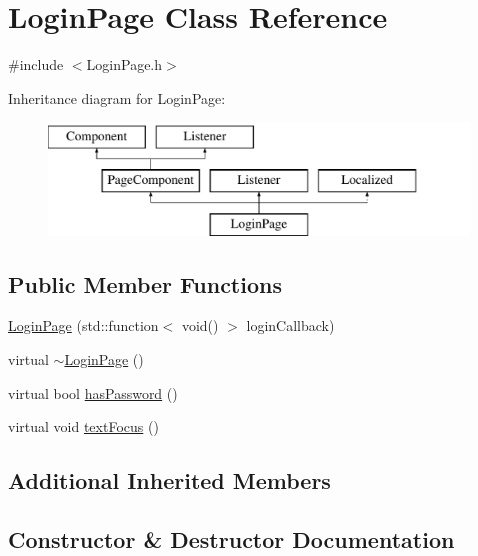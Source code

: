 \hypertarget{classLoginPage}{}\section{Login\+Page Class Reference}
\label{classLoginPage}


{\ttfamily \#include $<$Login\+Page.\+h$>$}

Inheritance diagram for Login\+Page\+:\begin{figure}[H]
\begin{center}
\leavevmode
\includegraphics[height=3.000000cm]{classLoginPage}
\end{center}
\end{figure}
\subsection*{Public Member Functions}
\begin{DoxyCompactItemize}
\item 
\mbox{\hyperlink{classLoginPage_ab5c2ee8d117c6c1245c181a7445c362a}{Login\+Page}} (std\+::function$<$ void() $>$ login\+Callback)
\item 
virtual \mbox{\hyperlink{classLoginPage_a6e2983811bf0dc3959e5b5075ebc58f1}{$\sim$\+Login\+Page}} ()
\item 
virtual bool \mbox{\hyperlink{classLoginPage_a12a46438d10e435351865223034db9fa}{has\+Password}} ()
\item 
virtual void \mbox{\hyperlink{classLoginPage_a9ff7597fd0d491c61ab8b5a4f4a7bd40}{text\+Focus}} ()
\end{DoxyCompactItemize}
\subsection*{Additional Inherited Members}


\subsection{Constructor \& Destructor Documentation}
\mbox{\label{classLoginPage_ab5c2ee8d117c6c1245c181a7445c362a}} 
